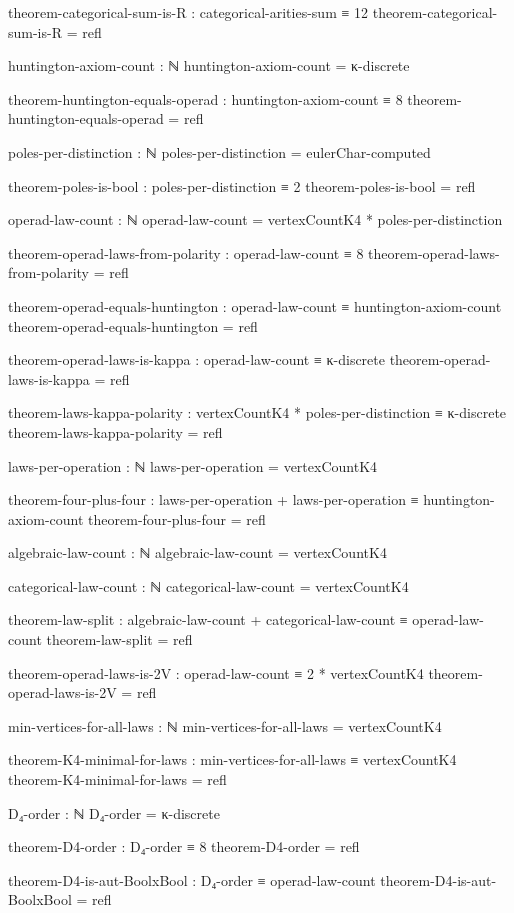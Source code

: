 \documentclass[11pt,a4paper]{book}
\begin{document}
\begin{code}
theorem-categorical-sum-is-R : categorical-arities-sum ≡ 12
theorem-categorical-sum-is-R = refl

huntington-axiom-count : ℕ
huntington-axiom-count = κ-discrete

theorem-huntington-equals-operad : huntington-axiom-count ≡ 8
theorem-huntington-equals-operad = refl

poles-per-distinction : ℕ
poles-per-distinction = eulerChar-computed

theorem-poles-is-bool : poles-per-distinction ≡ 2
theorem-poles-is-bool = refl

operad-law-count : ℕ
operad-law-count = vertexCountK4 * poles-per-distinction

theorem-operad-laws-from-polarity : operad-law-count ≡ 8
theorem-operad-laws-from-polarity = refl

theorem-operad-equals-huntington : operad-law-count ≡ huntington-axiom-count
theorem-operad-equals-huntington = refl

theorem-operad-laws-is-kappa : operad-law-count ≡ κ-discrete
theorem-operad-laws-is-kappa = refl

theorem-laws-kappa-polarity : vertexCountK4 * poles-per-distinction ≡ κ-discrete
theorem-laws-kappa-polarity = refl

laws-per-operation : ℕ
laws-per-operation = vertexCountK4

theorem-four-plus-four : laws-per-operation + laws-per-operation ≡ huntington-axiom-count
theorem-four-plus-four = refl

algebraic-law-count : ℕ
algebraic-law-count = vertexCountK4

categorical-law-count : ℕ
categorical-law-count = vertexCountK4

theorem-law-split : algebraic-law-count + categorical-law-count ≡ operad-law-count
theorem-law-split = refl

theorem-operad-laws-is-2V : operad-law-count ≡ 2 * vertexCountK4
theorem-operad-laws-is-2V = refl




min-vertices-for-all-laws : ℕ
min-vertices-for-all-laws = vertexCountK4

theorem-K4-minimal-for-laws : min-vertices-for-all-laws ≡ vertexCountK4
theorem-K4-minimal-for-laws = refl

D₄-order : ℕ
D₄-order = κ-discrete

theorem-D4-order : D₄-order ≡ 8
theorem-D4-order = refl

theorem-D4-is-aut-BoolxBool : D₄-order ≡ operad-law-count
theorem-D4-is-aut-BoolxBool = refl


\end{code}
\end{document}
